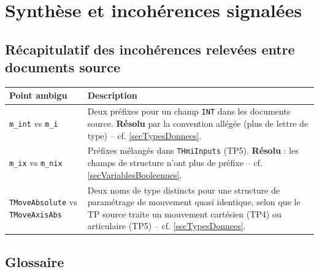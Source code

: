 \section{Synthèse et incohérences signalées}
\label{secGlossaire}

\subsection{Récapitulatif des incohérences relevées entre documents source}

\begin{center}
    \begin{tabular}{|p{4.4cm}|p{9cm}|}
        \hline
        \textbf{Point ambigu} & \textbf{Description} \\
        \hline
        \texttt{m\_int} vs \texttt{m\_i} & Deux préfixes pour un champ \texttt{INT} dans les documents source. \textbf{Résolu} par la convention allégée (plus de lettre de type) -- cf. \ref{secTypesDonnees}. \\
        \hline
        \texttt{m\_ix} vs \texttt{m\_nix} & Préfixes mélangés dans \texttt{THmiInputs} (TP5). \textbf{Résolu} : les champs de structure n'ont plus de préfixe -- cf. \ref{secVariablesBooleennes}. \\
        \hline
        \texttt{TMoveAbsolute} vs \texttt{TMoveAxisAbs} & Deux noms de type distincts pour une structure de paramétrage de mouvement quasi identique, selon que le TP source traite un mouvement cartésien (TP4) ou articulaire (TP5) -- cf. \ref{secTypesDonnees}. \\
        \hline
    \end{tabular}
\end{center}

\subsection{Glossaire}

